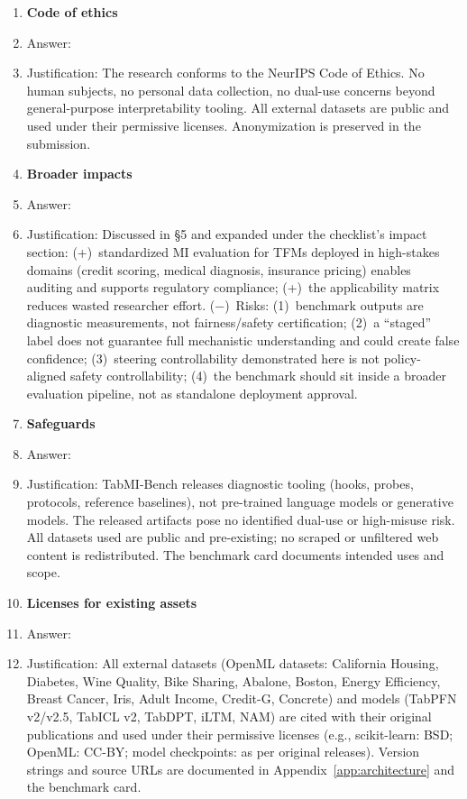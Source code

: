 \documentclass{article}
\begin{document}
\begin{enumerate}
\item {\bf Code of ethics}
    \item[] Answer: \answerYes{}
    \item[] Justification: The research conforms to the NeurIPS Code of Ethics. No human subjects, no personal data collection, no dual-use concerns beyond general-purpose interpretability tooling. All external datasets are public and used under their permissive licenses. Anonymization is preserved in the submission.

\item {\bf Broader impacts}
    \item[] Answer: \answerYes{}
    \item[] Justification: Discussed in \S5 and expanded under the checklist's impact section: (+)~standardized MI evaluation for TFMs deployed in high-stakes domains (credit scoring, medical diagnosis, insurance pricing) enables auditing and supports regulatory compliance; (+)~the applicability matrix reduces wasted researcher effort. ($-$)~Risks: (1)~benchmark outputs are diagnostic measurements, not fairness/safety certification; (2)~a ``staged'' label does not guarantee full mechanistic understanding and could create false confidence; (3)~steering controllability demonstrated here is not policy-aligned safety controllability; (4)~the benchmark should sit inside a broader evaluation pipeline, not as standalone deployment approval.

\item {\bf Safeguards}
    \item[] Answer: \answerNA{}
    \item[] Justification: TabMI-Bench releases diagnostic tooling (hooks, probes, protocols, reference baselines), not pre-trained language models or generative models. The released artifacts pose no identified dual-use or high-misuse risk. All datasets used are public and pre-existing; no scraped or unfiltered web content is redistributed. The benchmark card documents intended uses and scope.

\item {\bf Licenses for existing assets}
    \item[] Answer: \answerYes{}
    \item[] Justification: All external datasets (OpenML datasets: California Housing, Diabetes, Wine Quality, Bike Sharing, Abalone, Boston, Energy Efficiency, Breast Cancer, Iris, Adult Income, Credit-G, Concrete) and models (TabPFN v2/v2.5, TabICL v2, TabDPT, iLTM, NAM) are cited with their original publications and used under their permissive licenses (e.g., scikit-learn: BSD; OpenML: CC-BY; model checkpoints: as per original releases). Version strings and source URLs are documented in Appendix~\ref{app:architecture} and the benchmark card.


\end{enumerate}
\end{document}
